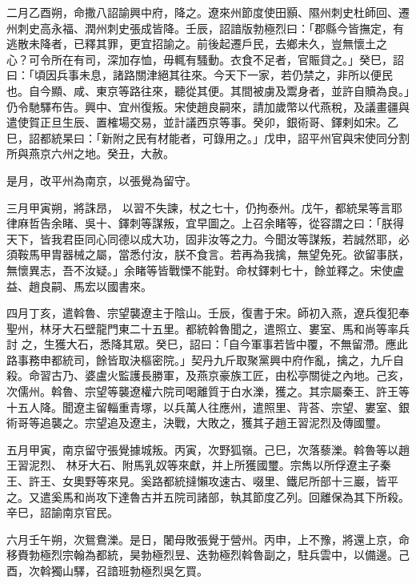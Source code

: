 \begin{pinyinscope}
 二月乙酉朔，命撒八詔諭興中府，降之。遼來州節度使田顥、隰州刺史杜師回、遷州刺史高永福、潤州刺史張成皆降。壬辰，詔諳版勃極烈曰：「郡縣今皆撫定，有逃散未降者，已釋其罪，更宜招諭之。前後起遷戶民，去鄉未久，豈無懷土之
 心？可令所在有司，深加存恤，毋輒有騷動。衣食不足者，官賑貸之。」癸巳，詔曰：「頃因兵事未息，諸路關津絕其往來。今天下一家，若仍禁之，非所以便民也。自今顯、咸、東京等路往來，聽從其便。其間被虜及鬻身者，並許自贖為良。」仍令馳驛布告。興中、宜州復叛。宋使趙良嗣來，請加歲幣以代燕稅，及議畫疆與遣使賀正旦生辰、置榷場交易，並計議西京等事。癸卯，銀術哥、鐸剌如宋。乙巳，詔都統杲曰：「新附之民有材能者，可錄用之。」戊申，詔平州官與宋使同分割所與燕京六州之地。癸丑，大赦。



 是月，改平州為南京，以張覺為留守。



 三月甲寅朔，將誅昂，
 以習不失諫，杖之七十，仍拘泰州。戊午，都統杲等言耶律麻哲告余睹、吳十、鐸刺等謀叛，宜早圖之。上召余睹等，從容謂之曰：「朕得天下，皆我君臣同心同德以成大功，固非汝等之力。今聞汝等謀叛，若誠然耶，必須鞍馬甲胄器械之屬，當悉付汝，朕不食言。若再為我擒，無望免死。欲留事朕，無懷異志，吾不汝疑。」余睹等皆戰慄不能對。命杖鐸剌七十，餘並釋之。宋使盧益、趙良嗣、馬宏以國書來。



 四月丁亥，遣斡魯、宗望襲遼主于陰山。壬辰，復書于宋。師初入燕，遼兵復犯奉聖州，林牙大石壁龍門東二十五里。都統斡魯聞之，遣照立、婁室、馬和尚等率兵討
 之，生獲大石，悉降其眾。癸巳，詔曰：「自今軍事若皆中覆，不無留滯。應此路事務申都統司，餘皆取決樞密院。」契丹九斤取聚黨興中府作亂，擒之，九斤自殺。命習古乃、婆盧火監護長勝軍，及燕京豪族工匠，由松亭關徙之內地。己亥，次儒州。斡魯、宗望等襲遼權六院司喝離質于白水濼，獲之。其宗屬秦王、許王等十五人降。聞遼主留輜重青塚，以兵萬人往應州，遣照里、背荅、宗望、婁室、銀術哥等追襲之。宗望追及遼主，決戰，大敗之，獲其子趙王習泥烈及傳國璽。



 五月甲寅，南京留守張覺據城叛。丙寅，次野狐嶺。己巳，次落藜濼。斡魯等以趙王習泥烈、
 林牙大石、附馬乳奴等來獻，并上所獲國璽。宗雋以所俘遼主子秦王、許王、女奧野等來見。奚路都統撻懶攻速古、啜里、鐵尼所部十三巖，皆平之。又遣奚馬和尚攻下達魯古并五院司諸部，執其節度乙列。回離保為其下所殺。辛巳，詔諭南京官民。



 六月壬午朔，次鴛鴦濼。是日，闍母敗張覺于營州。丙申，上不豫，將還上京，命移賚勃極烈宗翰為都統，昊勃極烈昱、迭勃極烈斡魯副之，駐兵雲中，以備邊。己酉，次斡獨山驛，召諳班勃極烈吳乞買。




\end{pinyinscope}
